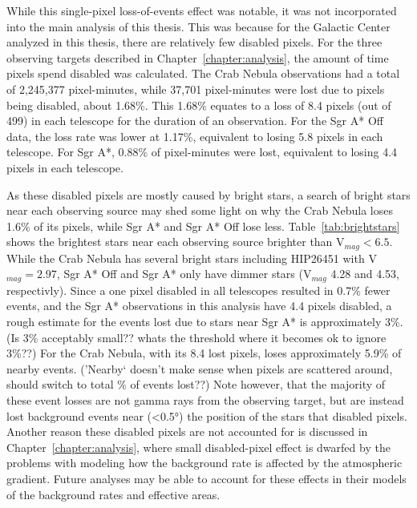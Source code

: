     While this single-pixel loss-of-events effect was notable, it was not incorporated into the main analysis of this thesis.
    This was because for the Galactic Center analyzed in this thesis, there are relatively few disabled pixels.
    For the three observing targets described in Chapter~\ref{chapter:analysis}, the amount of time pixels spend disabled was calculated.
    The Crab Nebula observations had a total of 2,245,377 pixel-minutes, while 37,701 pixel-minutes were lost due to pixels being disabled, about 1.68\%.
    This 1.68\% equates to a loss of 8.4 pixels (out of 499) in each telescope for the duration of an observation.
    For the Sgr A* Off data, the loss rate was lower at 1.17\%, equivalent to losing 5.8 pixels in each telescope.
    For Sgr A*, 0.88\% of pixel-minutes were lost, equivalent to losing 4.4 pixels in each telescope.

    As these disabled pixels are mostly caused by bright stars, a search of bright stars near each observing source may shed some light on why the Crab Nebula loses 1.6\% of its pixels, while Sgr A* and Sgr A* Off lose less.
    Table~\ref{tab:brightstars} shows the brightest stars near each observing source brighter than V${}_{mag}<6.5$.
    While the Crab Nebula has several bright stars including HIP26451 with V${}_{mag} = 2.97$, Sgr A* Off and Sgr A* only have dimmer stars (V${}_{mag}$ 4.28 and 4.53, respectivly).
    Since a one pixel disabled in all telescopes resulted in 0.7\% fewer events, and the Sgr A* observations in this analysis have \nicetilde{}4.4 pixels disabled, a rough estimate for the events lost due to stars near Sgr A* is approximately 3\%.
    {\color{red}(Is 3\% acceptably small?? whats the threshold where it becomes ok to ignore 3\%??)}
    For the Crab Nebula, with its 8.4 lost pixels, loses approximately 5.9\% of nearby events.
    {\color{red}('Nearby` doesn't make sense when pixels are scattered around, should switch to total \% of events lost??)}
    Note however, that the majority of these event losses are not gamma rays from the observing target, but are instead lost background events near (<\ang{0.5}) the position of the stars that disabled pixels.
    Another reason these disabled pixels are not accounted for is discussed in Chapter~\ref{chapter:analysis}, where small disabled-pixel effect is dwarfed by the problems with modeling how the background rate is affected by the atmospheric gradient.
    Future analyses may be able to account for these effects in their models of the background rates and effective areas.


